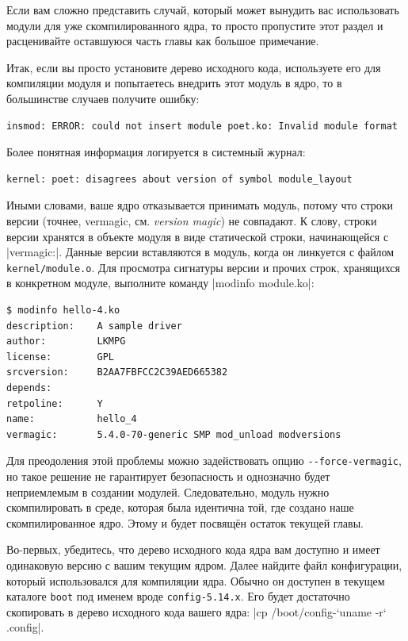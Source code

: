 \documentclass[10pt, oneside]{book}
\begin{document}
Если вам сложно представить случай, который может вынудить вас использовать модули для уже скомпилированного ядра, то просто пропустите этот раздел и расценивайте оставшуюся часть главы как большое примечание.

Итак, если вы просто установите дерево исходного кода, используете его для компиляции модуля и попытаетесь внедрить этот модуль в ядро, то в большинстве случаев получите ошибку:

\begin{verbatim}
insmod: ERROR: could not insert module poet.ko: Invalid module format
\end{verbatim}

Более понятная информация логируется в системный журнал:

\begin{verbatim}
kernel: poet: disagrees about version of symbol module_layout
\end{verbatim}

Иными словами, ваше ядро отказывается принимать модуль, потому что строки версии (точнее, vermagic, см. \textit{version magic}) не совпадают. К слову, строки версии хранятся в объекте модуля в виде статической строки, начинающейся с \cpp|vermagic:|.
Данные версии вставляются в модуль, когда он линкуется с файлом \verb|kernel/module.o|. Для просмотра сигнатуры версии и прочих строк, хранящихся в конкретном модуле, выполните команду \sh|modinfo module.ko|:

\begin{verbatim}
$ modinfo hello-4.ko
description:    A sample driver
author:         LKMPG
license:        GPL
srcversion:     B2AA7FBFCC2C39AED665382
depends:
retpoline:      Y
name:           hello_4
vermagic:       5.4.0-70-generic SMP mod_unload modversions
\end{verbatim}

Для преодоления этой проблемы можно задействовать опцию \verb|--force-vermagic|, но такое решение не гарантирует безопасность и однозначно будет неприемлемым в создании модулей. Следовательно, модуль нужно скомпилировать в среде, которая была идентична той, где создано наше скомпилированное ядро. Этому и будет посвящён остаток текущей главы.

Во-первых, убедитесь, что дерево исходного кода ядра вам доступно и имеет одинаковую версию с вашим текущим ядром. Далее найдите файл конфигурации, который использовался для компиляции ядра.
Обычно он доступен в текущем каталоге \verb|boot| под именем вроде \verb|config-5.14.x|.
Его будет достаточно скопировать в дерево исходного кода вашего ядра: \sh|cp /boot/config-`uname -r` .config|.
\end{document}
